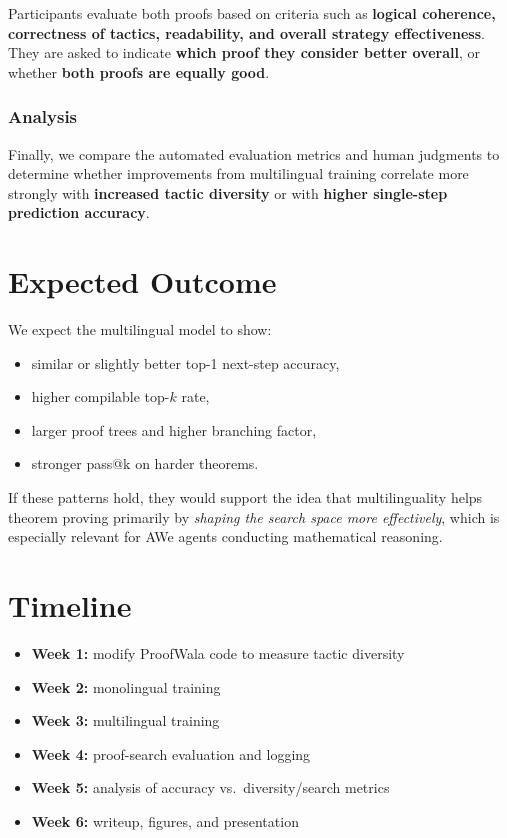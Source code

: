 \documentclass{article} %
\begin{document}
Participants evaluate both proofs based on criteria such as \textbf{logical coherence, correctness of tactics, readability, and overall strategy effectiveness}. They are asked to indicate \textbf{which proof they consider better overall}, or whether \textbf{both proofs are equally good}.

\subsubsection*{Analysis}

Finally, we compare the automated evaluation metrics and human judgments to determine whether improvements from multilingual training correlate more strongly with \textbf{increased tactic diversity} or with \textbf{higher single-step prediction accuracy}.

\section*{Expected Outcome}
We  expect the multilingual model to show:
\begin{itemize}
    \item similar or slightly better top-1 next-step accuracy,
    \item higher compilable top-$k$ rate,
    \item larger proof trees and higher branching factor,
    \item stronger pass@k on harder theorems.
\end{itemize}
If these patterns hold, they would support the idea that multilinguality helps theorem proving primarily by \emph{shaping the search space more effectively}, which is especially relevant for AWe  agents conducting mathematical reasoning.

\section*{Timeline}
\begin{itemize}
    \item \textbf{Week 1:} modify ProofWala code to measure tactic diversity
    \item \textbf{Week 2:} monolingual training
    \item \textbf{Week 3:} multilingual training
    \item \textbf{Week 4:} proof-search evaluation and logging
    \item \textbf{Week 5:} analysis of accuracy vs.\ diversity/search metrics
    \item \textbf{Week 6:} writeup, figures, and presentation
\end{itemize}
\end{document}
